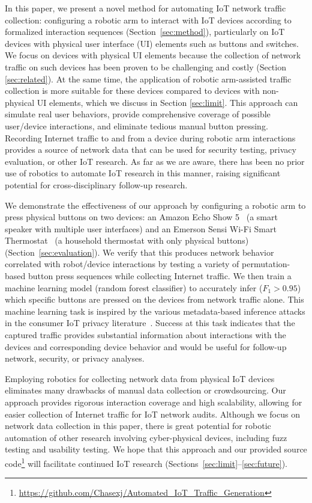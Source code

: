 In this paper, we present a novel method for automating IoT network traffic collection: configuring a robotic arm to interact with IoT devices according to formalized interaction sequences (Section~\ref{sec:method}), particularly on IoT devices with physical user interface (UI) elements such as buttons and switches. We focus on devices with physical UI elements because the collection of network traffic on such devices has been proven to be challenging and costly (Section \ref{sec:related}). At the same time, the application of robotic arm-assisted traffic collection is more suitable for these devices compared to devices with non-physical UI elements, which we discuss in Section \ref{sec:limit}.
This approach can simulate real user behaviors, provide comprehensive coverage of possible user/device interactions, and eliminate tedious manual button pressing. Recording Internet traffic to and from a device during robotic arm interactions provides a source of network data that can be used for security testing, privacy evaluation, or other IoT research.
As far as we are aware, there has been no prior use of robotics to automate IoT research in this manner, raising significant potential for cross-disciplinary follow-up research.

We demonstrate the effectiveness of our approach by configuring a robotic arm to press physical buttons on two devices: an Amazon Echo Show 5~\cite{echo} (a smart speaker with multiple user interfaces) and an Emerson Sensi Wi-Fi Smart Thermostat~\cite{sensi} (a household thermostat with only physical buttons) (Section~\ref{sec:evaluation}). We verify that this produces network behavior correlated with robot/device interactions by testing a variety of permutation-based button press sequences while collecting Internet traffic. We then train a machine learning model (random forest classifier) to accurately infer ($F_1 > 0.95$) which specific buttons are pressed on the devices from network traffic alone. 
This machine learning task is inspired by the various metadata-based inference attacks in the consumer IoT privacy literature~\cite{apthorpe2019keeping, acar2020peek, trimananda2020packet}.
Success at this task indicates that the captured traffic provides substantial information about interactions with the devices 
and corresponding device behavior and would be useful for follow-up network, security, or privacy analyses.

Employing robotics for collecting network data from physical IoT devices eliminates many drawbacks of manual data collection or crowdsourcing. Our approach provides rigorous interaction coverage and high scalability, allowing for easier collection of Internet traffic for IoT network audits. 
Although we focus on network data collection in this paper, there is great potential for robotic automation of other research involving cyber-physical devices, including fuzz testing and usability testing.
We hope that this approach and our provided source code\footnote{\href{https://github.com/Chasexj/Automated\_IoT\_Traffic\_Generation}{https://github.com/Chasexj/Automated\_IoT\_Traffic\_Generation}} will facilitate continued IoT research (Sections~\mbox{\ref{sec:limit}--\ref{sec:future}}).